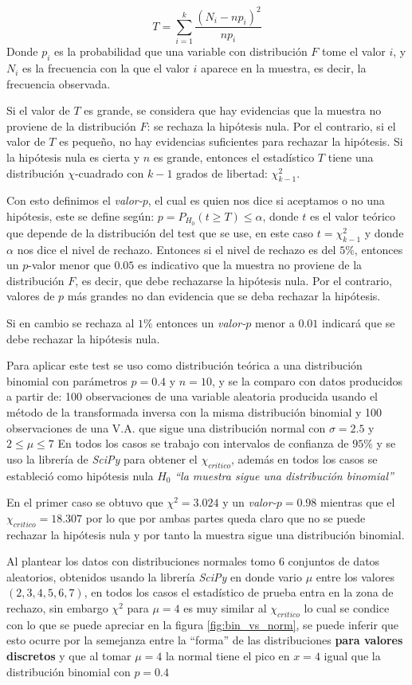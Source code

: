 \documentclass[baaa]{baaa}
\begin{document}
\[
T = \sum_{i=1}^{k} \frac{(N_i - n p_i)^2}{n p_i}
\]
Donde $p_i$ es la probabilidad que una variable con distribución $F$ tome el valor $i$, y $N_i$ es la frecuencia con la que el valor $i$ aparece en la muestra, es decir, la frecuencia observada.

Si el valor de $T$ es grande, se considera que hay evidencias que la muestra no proviene de la distribución $F$: se rechaza la hipótesis nula. Por el contrario, si el valor de $T$ es pequeño, no hay evidencias suficientes para rechazar la hipótesis. Si la hipótesis nula es cierta y $n$ es grande, entonces el estadístico $T$ tiene una distribución $\chi$-cuadrado con $k - 1$ grados de libertad: $\chi_{k-1}^2$.

Con esto definimos el \textit{valor-$p$}, el cual es quien nos dice si aceptamos o no una hipótesis, este se define según: $p = P_{H_0} (t \geq T) \leq  \alpha$, donde $t$ es el valor teórico que depende de la distribución del test que se use, en este caso $t=\chi^2_{k-1}$ y donde $\alpha$ nos dice el nivel de rechazo. Entonces si el nivel de rechazo es del $5\%$, entonces un $p$-valor menor que $0.05$ es indicativo que la muestra no proviene de la distribución $F$, es decir, que debe rechazarse la hipótesis nula. Por el contrario, valores de $p$ más grandes no dan evidencia que se deba rechazar la hipótesis.

Si en cambio se rechaza al $1\%$ entonces un \textit{valor-$p$} menor a $0.01$ indicará que se debe rechazar la hipótesis nula.

Para aplicar este test se uso como distribución teórica a una distribución binomial con parámetros $p=0.4$ y $n=10$, y se la comparo con datos producidos a partir de: 100 observaciones de una variable aleatoria producida usando el método de la transformada inversa con la misma distribución binomial y 100 observaciones de una V.A. que sigue una distribución normal con $\sigma=2.5$ y $2\leq\mu\leq7$ 
En todos los casos se trabajo con intervalos de confianza de $95\%$ y se uso la librería de \textit{SciPy} para obtener el $\chi_{critico}$, además en todos los casos se estableció como hipótesis nula $H_0$ \textit{``la muestra sigue una distribución binomial''} 

En el primer caso se obtuvo que $\chi^2=3.024$ y un \textit{valor-$p$}$=0.98$ mientras que el $\chi_{critico}=18.307$ por lo que por ambas partes queda claro que no se puede rechazar la hipótesis nula y por tanto la muestra sigue una distribución binomial.

Al plantear los datos con distribuciones normales tomo 6 conjuntos de datos aleatorios, obtenidos usando la librería \textit{SciPy} en donde vario $\mu$ entre los valores $(2,3,4,5,6,7)$, en todos los casos el estadístico de prueba entra en la zona de rechazo, sin embargo $\chi^2$ para $\mu=4$ es muy similar al $\chi_{critico}$ lo cual se condice con lo que se puede apreciar en la figura \ref{fig:bin_vs_norm}, se puede inferir que esto ocurre por la semejanza entre la ``forma'' de las distribuciones \textbf{para valores discretos} y que al tomar $\mu=4$ la normal tiene el pico en $x=4$ igual que la distribución binomial con $p=0.4$     
\end{document}
